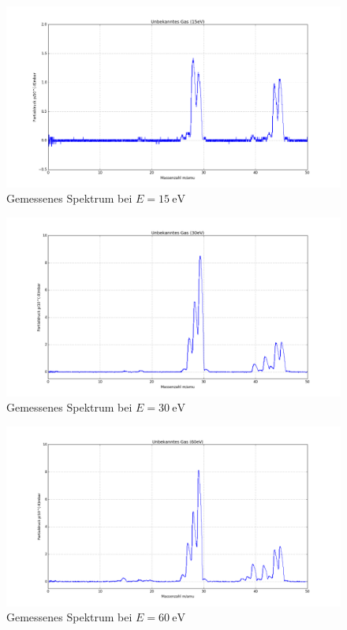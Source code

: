 \begin{figure}[tb]
	\centering\includegraphics[width=1.1\textwidth]{fig/a5_15ev.png}
	\caption{Gemessenes Spektrum bei $E=\SI{15}{\electronvolt}$}
	\label{fig:v51}
\end{figure}

\begin{figure}[tb]
	\centering\includegraphics[width=1.1\textwidth]{fig/a5_30ev.png}
	\caption{Gemessenes Spektrum bei $E=\SI{30}{\electronvolt}$}
	\label{fig:v52}
\end{figure}

\begin{figure}[tb]
	\centering\includegraphics[width=1.1\textwidth]{fig/a5_60ev.png}
	\caption{Gemessenes Spektrum bei $E=\SI{60}{\electronvolt}$}
	\label{fig:v53}
\end{figure}


